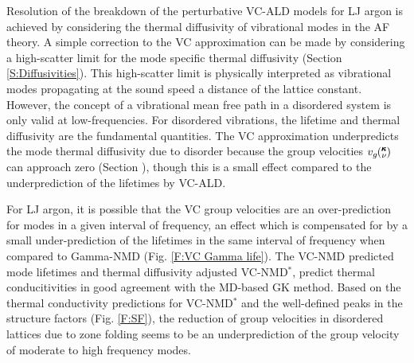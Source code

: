 \documentclass[aps,prb,twocolumn,superscriptaddress,amsmath,amssymb,floatfix]{revtex4}
\newcommand{\kv}{\mspace{-4.0mu}\left(\mspace{-8.0mu}
\begin{smallmatrix}&\pmb{\kappa} \\&\nu\end{smallmatrix}
\mspace{-3.0mu}\right)}
\begin{document}
Resolution 
of the breakdown of the perturbative VC-ALD models for LJ argon 
is achieved by considering the thermal diffusivity of vibrational 
modes in the AF theory. 
A simple correction to the VC approximation can be made by considering 
a high-scatter limit for the mode specific thermal 
diffusivity (Section \ref{S:Diffusivities}). 
This high-scatter limit is physically interpreted as vibrational modes 
propagating at the sound speed a distance of the lattice constant. 
However, the concept of a vibrational mean free path 
in a disordered system is only valid at low-frequencies.
\cite{feldman_numerical_1999,xu_energy_2009} For 
disordered vibrations, the lifetime and thermal diffusivity are the 
fundamental quantities. The VC approximation underpredicts 
the mode thermal 
diffusivity due to disorder because the group velocities $v_g\kv$ can 
approach zero (Section ), though this is a small effect compared to 
the underprediction of the lifetimes by VC-ALD. 

For LJ argon, it is possible that the VC group velocities are an 
over-prediction for modes in a given interval of frequency, 
an effect which is compensated for 
by a small under-prediction of the lifetimes in the same interval of 
frequency when compared to Gamma-NMD (Fig. \ref{F:VC Gamma life}). 
The VC-NMD predicted 
mode lifetimes and thermal diffusivity adjusted VC-NMD$^*$, 
predict thermal conducitivities in good agreement with 
the MD-based GK method. 
Based on the thermal conductivity predictions for VC-NMD$^*$ and 
the well-defined peaks in the structure factors 
(Fig. \ref{F:SF}), the reduction of group velocities in 
disordered lattices 
due to zone folding seems to be an underprediction of the group 
velocity of moderate to high frequency modes.\cite{duda_reducing_2011}  


\end{document}
